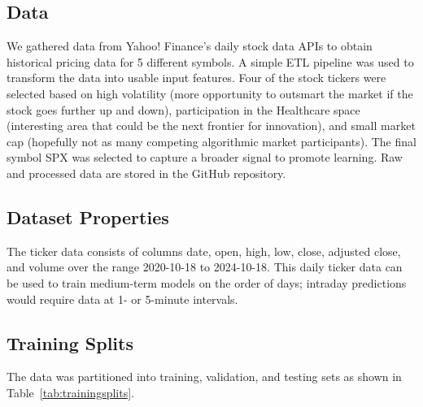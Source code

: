 \documentclass[10pt,twocolumn,letterpaper]{article}
\begin{document}

\subsection{Data}

We gathered data from Yahoo! Finance’s daily stock data APIs to obtain historical pricing data for 5 different symbols\cite{yahoo_finance_api,yfinance}. A simple ETL pipeline was used to transform the data into usable input features. Four of the stock tickers were selected based on high volatility (more opportunity to outsmart the market if the stock goes further up and down), participation in the Healthcare space (interesting area that could be the next frontier for innovation), and small market cap (hopefully not as many competing algorithmic market participants). The final symbol SPX was selected to capture a broader signal to promote learning. Raw and processed data are stored in the GitHub repository.

\subsection{Dataset Properties}

The ticker data consists of columns date, open, high, low, close, adjusted close, and volume over the range 2020-10-18 to 2024-10-18. This daily ticker data can be used to train medium-term models on the order of days; intraday predictions would require data at 1- or 5-minute intervals.

\subsection{Training Splits}

The data was partitioned into training, validation, and testing sets as shown in Table~\ref{tab:trainingsplits}.

\end{document}
